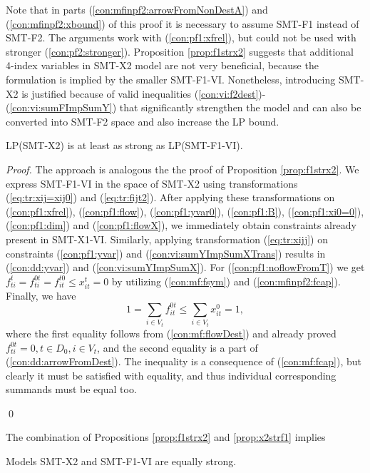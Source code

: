 Note that in parts (\ref{con:mfinpf2:arrowFromNonDestA}) and (\ref{con:mfinpf2:xbound}) of this proof it is necessary to assume SMT-F1 instead of SMT-F2.
The arguments work with (\ref{con:pf1:xfrel}), but could not be used with stronger (\ref{con:pf2:stronger}).
Proposition \ref{prop:f1strx2} suggests that additional 4-index variables in SMT-X2 model are not very beneficial, because the formulation is implied by the smaller SMT-F1-VI.
Nonetheless, introducing SMT-X2 is justified because of valid inequalities (\ref{con:vi:f2dest})-(\ref{con:vi:sumFImpSumY}) that significantly strengthen the model and can also be converted into SMT-F2 space and also increase the LP bound.

\begin{prop}
\label{prop:x2strf1}
LP(SMT-X2) is at least as strong as LP(SMT-F1-VI). 
\end{prop}
\begin{proof}
The approach is analogous the the proof of Proposition \ref{prop:f1strx2}.
We express SMT-F1-VI in the space of SMT-X2 using transformations (\ref{eq:tr:xij=xij0}) and (\ref{eq:tr:fijt2}).
After applying these transformations on (\ref{con:pf1:xfrel}), (\ref{con:pf1:flow}), (\ref{con:pf1:yvar0}), (\ref{con:pf1:B}), (\ref{con:pf1:xi0=0}), (\ref{con:pf1:dim}) and (\ref{con:pf1:flowX}), we immediately obtain constraints already present in SMT-X1-VI.
Similarly, applying transformation (\ref{eq:tr:xijj}) on constraints (\ref{con:pf1:yvar}) and (\ref{con:vi:sumYImpSumXTrans}) results in (\ref{con:dd:yvar}) and (\ref{con:vi:sumYImpSumX}).
For (\ref{con:pf1:noflowFromT}) we get $f^t_{ti}=f^{0t}_{ti}=f^{t0}_{it}\leq x^t_{it}=0$ by utilizing (\ref{con:mf:fsym}) and (\ref{con:mfinpf2:fcap}).
Finally, we have $$1=\sum_{i\in V_t}f^{0t}_{it}\leq \sum_{i\in V_t}x^0_{it}=1,$$ where the first equality follows from (\ref{con:mf:flowDest}) and already proved $f^{0t}_{ti}=0, t\in D_0,i\in V_t$, and the second equality is a part of (\ref{con:dd:arrowFromDest}).
The inequality is a consequence of (\ref{con:mf:fcap}), but clearly it must be satisfied with equality, and thus individual corresponding summands must be equal too.
 
\qed
\end{proof}
The combination of Propositions \ref{prop:f1strx2} and \ref{prop:x2strf1} implies
\begin{corollary}
Models SMT-X2 and SMT-F1-VI are equally strong.
\end{corollary}
